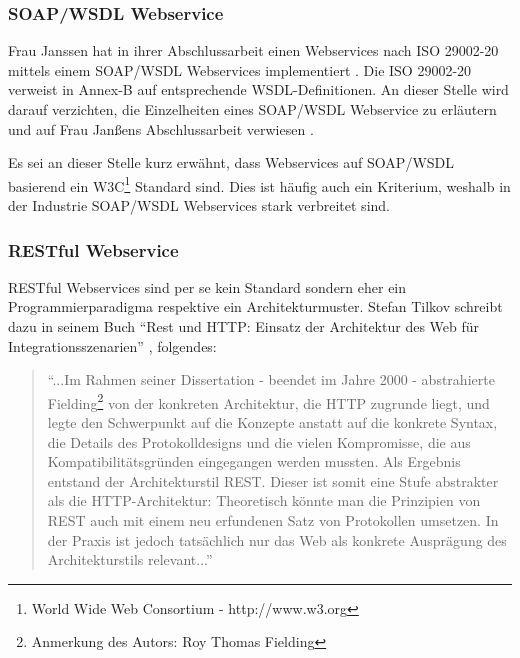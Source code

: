 \subsubsection{SOAP/WSDL Webservice}
Frau Janssen hat in ihrer Abschlussarbeit einen \glspl{Webservice} nach ISO 29002-20 mittels einem  \gls{SOAP}/\gls{WSDL} \glspl{Webservice} implementiert \citep[vgl.][]{janssen}. Die ISO 29002-20 verweist in Annex-B auf entsprechende \gls{WSDL}-Definitionen. 
An dieser Stelle wird darauf verzichten, die Einzelheiten eines SOAP/WSDL Webservice zu erläutern und auf Frau Janßens Abschlussarbeit verwiesen \citep[vgl.][Kap. 3]{janssen}. 

Es sei an dieser Stelle kurz erwähnt, dass \glspl{Webservice} auf \gls{SOAP}/\gls{WSDL} basierend ein W3C\footnote{World Wide Web Consortium - http://www.w3.org} Standard sind. Dies ist häufig auch ein Kriterium, weshalb in der Industrie \gls{SOAP}/\gls{WSDL} \glspl{Webservice} stark verbreitet sind. 

\subsubsection{RESTful Webservice}  
\gls{REST}ful Webservices sind per se kein Standard sondern eher ein Programmierparadigma respektive ein Architekturmuster. 
Stefan Tilkov schreibt dazu in seinem Buch \enquote{Rest und HTTP: Einsatz der Architektur des Web für Integrationsszenarien} \citep[S.10][]{tilkovrest}, folgendes:

\begin{quotation}
\enquote{...Im Rahmen seiner Dissertation - beendet im Jahre 2000 - abstrahierte Fielding\footnote{Anmerkung des Autors: Roy Thomas Fielding} von der konkreten Architektur, die \gls{HTTP} zugrunde liegt, und legte den Schwerpunkt auf die Konzepte anstatt auf die konkrete Syntax, die Details des Protokolldesigns und die vielen Kompromisse, die aus Kompatibilitätsgründen eingegangen werden mussten. Als Ergebnis entstand der Architekturstil \gls{REST}. Dieser ist somit eine Stufe abstrakter als die \gls{HTTP}-Architektur: Theoretisch könnte man die Prinzipien von \gls{REST} auch mit einem neu erfundenen Satz von Protokollen umsetzen. In der Praxis ist jedoch tatsächlich nur das Web als konkrete Ausprägung des Architekturstils relevant...}
\end{quotation}
\citep[Vgl. auch][]{fieldingrest}

